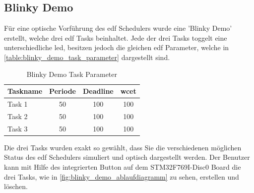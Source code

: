 \documentclass[../EDF Master Thesis.tex]{subfiles}
\begin{document}
    \clearpage
    \subsection{Blinky Demo} \label{section:blinky_demo}
        Für eine optische Vorführung des \ac{edf} Schedulers wurde eine 'Blinky Demo' erstellt, welche drei \ac{edf} Tasks beinhaltet.
        Jede der drei Tasks toggelt eine unterschiedliche \ac{led}, besitzen jedoch die gleichen \ac{edf} Parameter, welche in \autoref{table:blinky_demo_task_parameter} dargestellt sind.

        \begin{table}[ht!]
            \centering
            \begin{tabular}{l|c|c|c}
                Taskname & Periode & Deadline & \ac{wcet} \\
                \hline
                Task 1 & 50 & 100 & 100\\
                Task 2 & 50 & 100 & 100\\
                Task 3 & 50 & 100 & 100\\
            \end{tabular}
            \caption{Blinky Demo Task Parameter}
            \label{table:blinky_demo_task_parameter}
        \end{table}

        Die drei Tasks wurden exakt so gewählt, dass Sie die verschiedenen möglichen Status des \ac{edf} Schedulers simuliert und optisch dargestellt werden.
        Der Benutzer kann mit Hilfe des integrierten Button auf dem STM32F769I-Disc0 Board die drei Tasks, wie in \autoref{fig:blinky_demo_ablaufdiagramm} zu sehen, erstellen und löschen.
        
\end{document}
